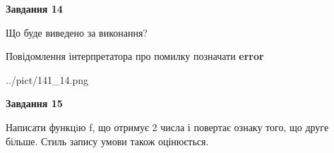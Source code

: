 \documentclass[11pt, ukrainian]{article}
\begin{document}
{\begin {large}
{\begin {center}\textbf{Завдання 14}\end {center}}\par
Що буде виведено за виконання? \par
Повідомлення інтерпретатора про помилку позначати \textbf{error}

\begin{center}
	{../pict/141_14.png}
\end{center}
\newpage

{\begin {center}\textbf{Завдання 15}\end {center}}\par

Написати функцiю f, що отримує 2 числа і повертає ознаку того, що друге більше. Стиль запису умови також оцінюється.\par
\newpage

\end {large}}
\end{document}
